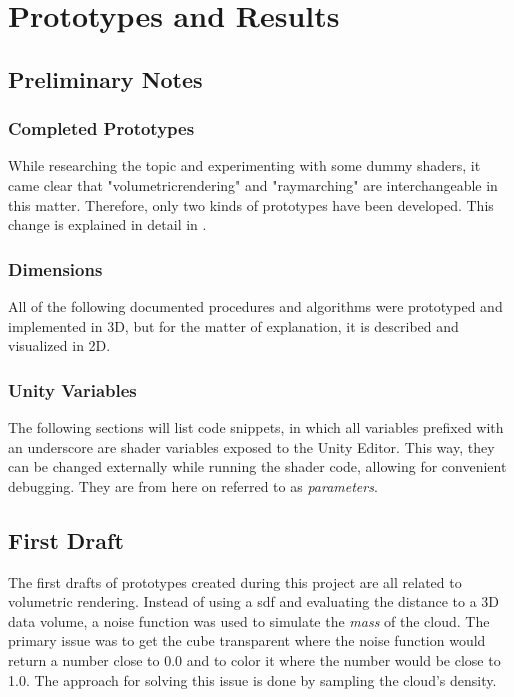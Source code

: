 \section{Prototypes and Results}

\subsection{Preliminary Notes}
\subsubsection{Completed Prototypes}
While researching the topic and experimenting with some dummy shaders, it came clear that "\gls{volumetricrendering}" and "\gls{raymarching}" are interchangeable in this matter.
Therefore, only two kinds of prototypes have been developed. This change is explained in detail in .

\subsubsection{Dimensions}
All of the following documented procedures and algorithms were prototyped and implemented in 3D, but for the matter of explanation, it is described and visualized in 2D.

\subsubsection{Unity Variables}
The following sections will list code snippets, in which all variables prefixed with an underscore are shader variables exposed to the Unity Editor. This way, they can be changed externally while running the shader code, allowing for convenient debugging.
They are from here on referred to as \textit{\gls{parameters}}.

\clearpage
\subsection{First Draft}
The first drafts of prototypes created during this project are all related to volumetric rendering. 
Instead of using a \gls{sdf} and evaluating the distance to a 3D data volume, a noise function was used to simulate the \textit{mass} of the cloud. 
The primary issue was to get the cube transparent where the noise function would return a number close to 0.0 and to color it where the number would be close to 1.0.
The approach for solving this issue is done by sampling the cloud's density.

